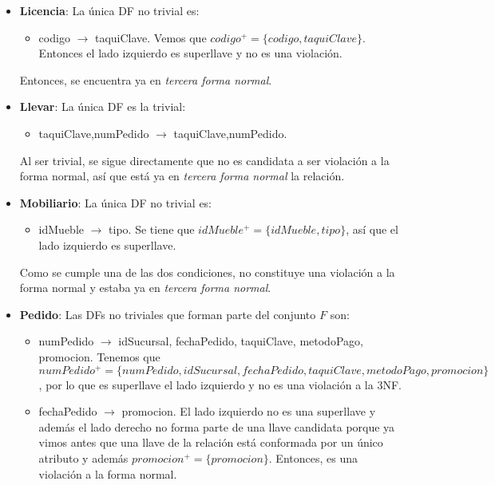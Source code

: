 \documentclass[11pt,letterpaper]{article}
\begin{document}
\begin{itemize}
\item \textbf{Licencia}: La única DF no trivial es:

\begin{itemize}
\item codigo $\rightarrow$ taquiClave. Vemos que $codigo^+=\{codigo,taquiClave\}$. Entonces el lado izquierdo es superllave y no es una violación.
\end{itemize}

Entonces, se encuentra ya en \textit{tercera forma normal}.

\item \textbf{Llevar}:  La única DF es la trivial:

\begin{itemize}
\item taquiClave,numPedido $\rightarrow$ taquiClave,numPedido.
\end{itemize}

Al ser trivial, se sigue directamente que no es candidata a ser violación a la forma normal, así que está ya en \textit{tercera forma normal} la relación. 

\item \textbf{Mobiliario}: La única DF no trivial es:


\begin{itemize}

\item idMueble $\rightarrow$ tipo. Se tiene que $idMueble^+=\{idMueble,tipo\}$, así que el lado izquierdo es superllave.
\end{itemize}

Como se cumple una de las dos condiciones, no constituye una violación a la forma normal y estaba ya en \textit{tercera forma normal}.

\item \textbf{Pedido}: Las DFs no triviales que forman parte del conjunto $F$ son:

\begin{itemize}
\item numPedido $\rightarrow$ idSucursal, fechaPedido, taquiClave, metodoPago, promocion. Tenemos que $numPedido^+=\{numPedido,idSucursal, fechaPedido, taquiClave, metodoPago, promocion\}$, por lo que es superllave el lado izquierdo y no es una violación a la 3NF.
\item fechaPedido $\rightarrow$ promocion. El lado izquierdo no es una superllave y además el lado derecho no forma parte de una llave candidata porque ya vimos antes que una llave de la relación está conformada por un único atributo y además $promocion^+=\{promocion\}$. Entonces, es una violación a la forma normal.
\end{itemize}


\end{itemize}
\end{document}
